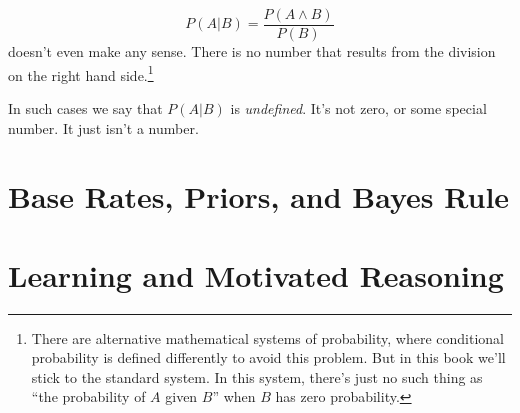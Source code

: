 \documentclass[]{tufte-book}
\begin{document}
\[ P(A | B) = \frac{P(A \wedge B)}{P(B)} \]
doesn't even make any sense. There is no number that results from the division on the right hand side.\footnote{There are alternative mathematical systems of probability, where conditional probability is defined differently to avoid this problem. But in this book we'll stick to the standard system. In this system, there's just no such thing as ``the probability of \(A\) given \(B\)'' when \(B\) has zero probability.}

In such cases we say that \(P(A | B)\) is \emph{undefined}. It's not zero, or some special number. It just isn't a number.

\hypertarget{base-rates-priors-and-bayes-rule}{%
\chapter{Base Rates, Priors, and Bayes Rule}\label{base-rates-priors-and-bayes-rule}}

\hypertarget{learning-and-motivated-reasoning}{%
\chapter{Learning and Motivated Reasoning}\label{learning-and-motivated-reasoning}}
\end{document}
